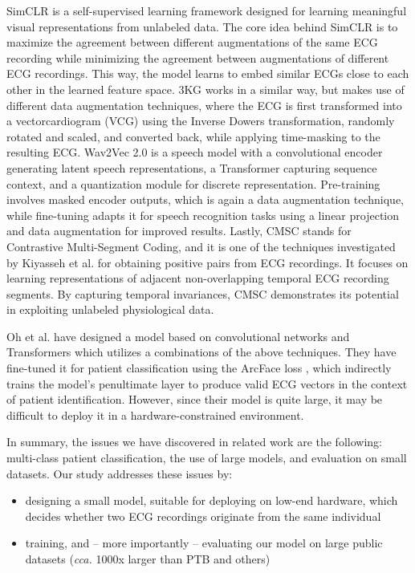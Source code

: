 \documentclass[preprint,12pt]{elsarticle}
\begin{document}
SimCLR \cite{chen2020simple} is a self-supervised learning framework designed for learning meaningful visual representations from unlabeled data. The core idea behind SimCLR is to maximize the agreement between different augmentations of the same ECG recording while minimizing the agreement between augmentations of different ECG recordings. This way, the model learns to embed similar ECGs close to each other in the learned feature space. 3KG \cite{gopal20213kg} works in a similar way, but makes use of different data augmentation techniques, where the ECG is first transformed into a vectorcardiogram (VCG) using the Inverse Dowers transformation, randomly rotated and scaled, and converted back, while applying time-masking to the resulting ECG. Wav2Vec 2.0 \cite{baevski2020wav2vec} is a speech model with a convolutional encoder generating latent speech representations, a Transformer capturing sequence context, and a quantization module for discrete representation. Pre-training involves masked encoder outputs, which is again a data augmentation technique, while fine-tuning adapts it for speech recognition tasks using a linear projection and data augmentation for improved results. Lastly, CMSC \cite{kiyasseh2021clocs} stands for Contrastive Multi-Segment Coding, and it is one of the techniques investigated by Kiyasseh et al. for obtaining positive pairs from ECG recordings. It focuses on learning representations of adjacent non-overlapping temporal ECG recording segments. By capturing temporal invariances, CMSC demonstrates its potential in exploiting unlabeled physiological data. 

Oh et al. \cite{oh2022lead} have designed a model based on convolutional networks and Transformers \cite{vaswani2017attention} which utilizes a combinations of the above techniques. They have fine-tuned it for patient classification using the ArcFace loss \cite{deng2019arcface}, which indirectly trains the model's penultimate layer to produce valid ECG vectors in the context of patient identification. However, since their model is quite large, it may be difficult to deploy it in a hardware-constrained environment.

In summary, the issues we have discovered in related work are the following: multi-class patient classification, the use of large models, and evaluation on small datasets. Our study addresses these issues by:
\begin{itemize}
    \item designing a small model, suitable for deploying on low-end hardware, which decides whether two ECG recordings originate from the same individual
    \item training, and -- more importantly -- evaluating our model on large public datasets (\textit{cca.} 1000x larger than PTB and others)
\end{itemize}
\end{document}
